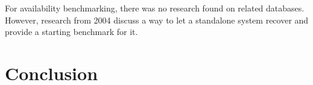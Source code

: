 \documentclass[final,5p,times]{elsarticle}
\begin{document}
For availability benchmarking, there was no research found on related databases. However, research from 2004 \cite{mauro2004system} discuss a way to let a standalone system recover and provide a starting benchmark for it.  


\section{Conclusion}\label{sec:conclusion}\todo{}












\end{document}
